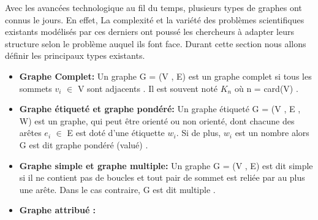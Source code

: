 
	Avec les avancées technologique au fil du temps, plusieurs types de graphes ont connus le jours. En effet, La complexité et la variété des problèmes scientifiques existants modélisés par ces derniers ont poussé les chercheurs à adapter leurs structure selon le problème auquel  ils font face. Durant cette section nous allons définir les principaux types existants.
	
		\begin{itemize}[label=$\circ$]
		
			\item \textbf{Graphe Complet:} Un graphe G = (V , E) est un graphe complet si tous les sommets $v_{i}$ $\in$ V sont adjacents \citep{Pres}. Il est souvent noté $K_{n}$ où n = card(V) \citep{DUT}.
				
			
			\item \textbf{Graphe étiqueté et graphe pondéré:}
			 Un graphe étiqueté G = (V , E , W) est un graphe, qui peut être orienté ou non orienté, dont chacune des arêtes $e_{i}$ $\in$ E est doté d'une étiquette $w_{i}$. Si de plus, $w_{i}$ est un nombre alors G est dit graphe pondéré (valué) \citep{DUT}.
		
			\item \textbf{Graphe simple et graphe multiple:}
			Un graphe G = (V , E) est dit simple si il ne contient pas de boucles et tout pair de sommet est reliée par au plus une arête. Dans le cas contraire, G est dit multiple \citep{IUTLyonInformatique}.
			
			
			
			\item \textbf{Graphe attribué : }
			
		
		\end{itemize}
		